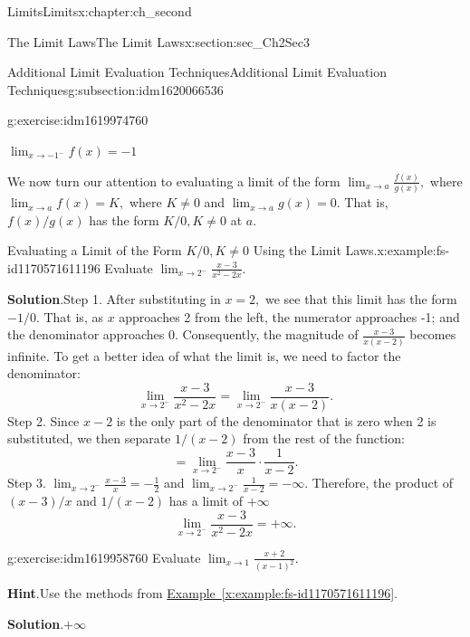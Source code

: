 \documentclass[oneside,10pt,]{book}
\newcommand{\blocktitlefont}{\relax}
\newcommand{\xreffont}{\relax}
\numberwithin{equation}{section}
\begin{document}
\begin{chapterptx}{Limits}{}{Limits}{}{}{x:chapter:ch_second}
\begin{sectionptx}{The Limit Laws}{}{The Limit Laws}{}{}{x:section:sec_Ch2Sec3}
\begin{subsectionptx}{Additional Limit Evaluation Techniques}{}{Additional Limit Evaluation Techniques}{}{}{g:subsection:idm1620066536}
\begin{inlineexercise}{}{g:exercise:idm1619974760}
\begin{image}{0.25}{0.5}{0.25}
\end{image}%
 \(\lim_{x\to -1^-}f(x)=-1\)%
\end{inlineexercise}%
We now turn our attention to evaluating a limit of the form \(\lim_{x \to a }\frac{f(x)}{g(x)},\) where \(\lim_{x \to a }f(x)=K,\) where \(K\neq 0\) and \(\lim_{x \to a }g(x)=0.\) That is, \(f(x)/g(x)\) has the form \(K/0,K\neq 0\) at \(a\).%
\begin{example}{Evaluating a Limit of the Form \(K/0,K\neq 0\) Using the Limit Laws.}{x:example:fs-id1170571611196}%
Evaluate \(\lim_{x \to 2^-}\frac{x-3}{x^2-2x}.\)%
\par\smallskip%
\noindent\textbf{\blocktitlefont Solution}.\hypertarget{g:solution:idm1619965800}{}\quad{}Step 1. After substituting in \(x=2,\) we see that this limit has the form \(-1/0.\) That is, as \(x\) approaches 2 from the left, the numerator approaches -1; and the denominator approaches 0. Consequently, the magnitude of \(\frac{x-3}{x(x-2)}\) becomes infinite. To get a better idea of what the limit is, we need to factor the denominator:%
%
\begin{equation*}
\lim_{x \to 2^-}\frac{x-3}{x^2-2x}=\lim_{x \to 2^-}\frac{x-3}{x(x-2)}.
\end{equation*}
Step 2. Since \(x-2\) is the only part of the denominator that is zero when 2 is substituted, we then separate \(1/(x-2)\) from the rest of the function:%
%
\begin{equation*}
=\lim_{x \to 2^-}\frac{x-3}{x}\cdot \frac{1}{x-2}.
\end{equation*}
Step 3. \(\lim_{x \to 2^-}\frac{x-3}{x}=-\frac{1}{2}\) and \(\lim_{x \to 2^-}\frac{1}{x-2}=-\infty.\) Therefore, the product of \((x-3)/x\) and \(1/(x-2)\) has a limit of \(+\infty\)%
%
\begin{equation*}
\lim_{x \to 2^-}\frac{x-3}{x^2-2x}=+\infty.
\end{equation*}
\end{example}
\begin{inlineexercise}{}{g:exercise:idm1619958760}%
Evaluate \(\lim_{x \to 1 }\frac{x+2}{(x-1)^2}.\)%
\par\smallskip%
\noindent\textbf{\blocktitlefont Hint}.\hypertarget{g:hint:idm1619954536}{}\quad{}Use the methods from \hyperref[x:example:fs-id1170571611196]{Example~{\xreffont\ref{x:example:fs-id1170571611196}}}.%
\par\smallskip%
\noindent\textbf{\blocktitlefont Solution}.\hypertarget{g:solution:idm1619955176}{}\quad{}\(+\infty\)%
\end{inlineexercise}%

\end{subsectionptx}
\end{sectionptx}
\end{chapterptx}
\end{document}
